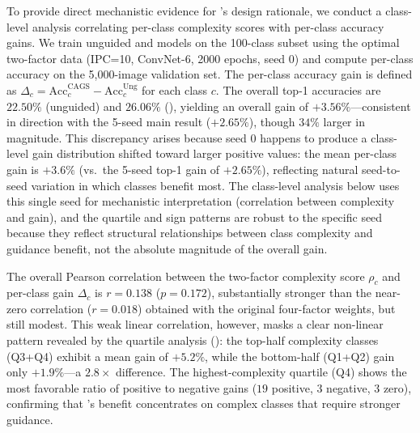 To provide direct mechanistic evidence for \cags{}'s design rationale, we conduct a class-level analysis correlating per-class complexity scores with per-class accuracy gains. We train unguided and \cags{} models on the 100-class subset using the optimal two-factor data (IPC=10, ConvNet-6, 2000 epochs, seed 0) and compute per-class accuracy on the 5{,}000-image validation set. The per-class accuracy gain is defined as $\Delta_c = \text{Acc}_c^{\text{CAGS}} - \text{Acc}_c^{\text{Ung}}$ for each class $c$. The overall top-1 accuracies are $22.50\%$ (unguided) and $26.06\%$ (\cags{}), yielding an overall gain of $+3.56\%$---consistent in direction with the 5-seed main result ($+2.65\%$), though $34\%$ larger in magnitude. This discrepancy arises because seed 0 happens to produce a class-level gain distribution shifted toward larger positive values: the mean per-class gain is $+3.6\%$ (vs.\ the 5-seed top-1 gain of $+2.65\%$), reflecting natural seed-to-seed variation in which classes benefit most. The class-level analysis below uses this single seed for mechanistic interpretation (correlation between complexity and gain), and the quartile and sign patterns are robust to the specific seed because they reflect structural relationships between class complexity and guidance benefit, not the absolute magnitude of the overall gain.

The overall Pearson correlation between the two-factor complexity score $\rho_c$ and per-class gain $\Delta_c$ is $r = 0.138$ ($p = 0.172$), substantially stronger than the near-zero correlation ($r = 0.018$) obtained with the original four-factor weights, but still modest. This weak linear correlation, however, masks a clear non-linear pattern revealed by the quartile analysis (): the top-half complexity classes (Q3+Q4) exhibit a mean gain of $+5.2\%$, while the bottom-half (Q1+Q2) gain only $+1.9\%$---a $2.8\times$ difference. The highest-complexity quartile (Q4) shows the most favorable ratio of positive to negative gains ($19$ positive, $3$ negative, $3$ zero), confirming that \cags{}'s benefit concentrates on complex classes that require stronger guidance.

